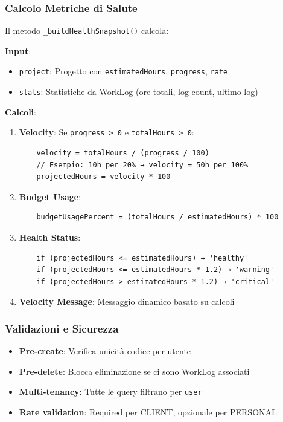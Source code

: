 \documentclass[11pt,a4paper]{article}
\begin{document}
\subsubsection{Calcolo Metriche di Salute}

Il metodo \texttt{\_buildHealthSnapshot()} calcola:

\textbf{Input}:
\begin{itemize}
    \item \texttt{project}: Progetto con \texttt{estimatedHours}, \texttt{progress}, \texttt{rate}
    \item \texttt{stats}: Statistiche da WorkLog (ore totali, log count, ultimo log)
\end{itemize}

\textbf{Calcoli}:
\begin{enumerate}
    \item \textbf{Velocity}: Se \texttt{progress > 0} e \texttt{totalHours > 0}:
    \begin{lstlisting}
    velocity = totalHours / (progress / 100)
    // Esempio: 10h per 20% → velocity = 50h per 100%
    projectedHours = velocity * 100
    \end{lstlisting}
    
    \item \textbf{Budget Usage}:
    \begin{lstlisting}
    budgetUsagePercent = (totalHours / estimatedHours) * 100
    \end{lstlisting}
    
    \item \textbf{Health Status}:
    \begin{lstlisting}
    if (projectedHours <= estimatedHours) → 'healthy'
    if (projectedHours <= estimatedHours * 1.2) → 'warning'
    if (projectedHours > estimatedHours * 1.2) → 'critical'
    \end{lstlisting}
    
    \item \textbf{Velocity Message}: Messaggio dinamico basato su calcoli
\end{enumerate}

\subsubsection{Validazioni e Sicurezza}

\begin{itemize}
    \item \textbf{Pre-create}: Verifica unicità codice per utente
    \item \textbf{Pre-delete}: Blocca eliminazione se ci sono WorkLog associati
    \item \textbf{Multi-tenancy}: Tutte le query filtrano per \texttt{user}
    \item \textbf{Rate validation}: Required per CLIENT, opzionale per PERSONAL
\end{itemize}
\end{document}
